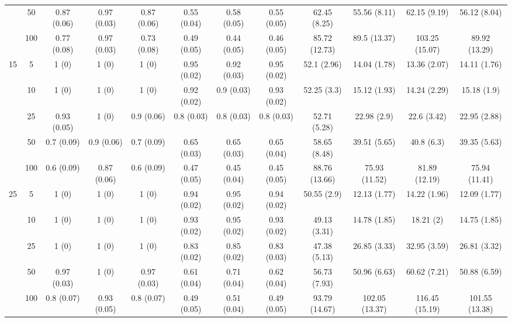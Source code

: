 \documentclass[11pt,3p,review,authoryear]{elsarticle}
\theoremstyle{definition}
\begin{document}
\begin{landscape}
\begin{table}[b]
\begin{center}
{\begin{tabular}{cc|ccc|ccc|cccc|}
  & 50  & 0.87 (0.06) & 0.97 (0.03) & 0.87 (0.06) & 0.55 (0.04) & 0.58 (0.05) & 0.55 (0.05) & 62.45 (8.25) & 55.56 (8.11) & 62.15 (9.19) & 56.12 (8.04) \\ 
  & 100  & 0.77 (0.08) & 0.97 (0.03) & 0.73 (0.08) & 0.49 (0.05) & 0.44 (0.05) & 0.46 (0.05) & 85.72 (12.73) & 89.5 (13.37) & 103.25 (15.07) & 89.92 (13.29) \\[.3cm] 
 \multirow{5}{*}{15} & 5  & 1 (0) & 1 (0) & 1 (0) & 0.95 (0.02) & 0.92 (0.03) & 0.95 (0.02) & 52.1 (2.96) & 14.04 (1.78) & 13.36 (2.07) & 14.11 (1.76) \\ 
  & 10  & 1 (0) & 1 (0) & 1 (0) & 0.92 (0.02) & 0.9 (0.03) & 0.93 (0.02) & 52.25 (3.3) & 15.12 (1.93) & 14.24 (2.29) & 15.18 (1.9) \\ 
    & 25  & 0.93 (0.05) & 1 (0) & 0.9 (0.06) & 0.8 (0.03) & 0.8 (0.03) & 0.8 (0.03) & 52.71 (5.28) & 22.98 (2.9) & 22.6 (3.42) & 22.95 (2.88) \\ 
    & 50  & 0.7 (0.09) & 0.9 (0.06) & 0.7 (0.09) & 0.65 (0.03) & 0.65 (0.03) & 0.65 (0.04) & 58.65 (8.48) & 39.51 (5.65) & 40.8 (6.3) & 39.35 (5.63) \\ 
    & 100  & 0.6 (0.09) & 0.87 (0.06) & 0.6 (0.09) & 0.47 (0.05) & 0.45 (0.04) & 0.45 (0.05) & 88.76 (13.66) & 75.93 (11.52) & 81.89 (12.19) & 75.94 (11.41) \\[.3cm] 
   \multirow{5}{*}{25} & 5  & 1 (0) & 1 (0) & 1 (0) & 0.94 (0.02) & 0.95 (0.02) & 0.94 (0.02) & 50.55 (2.9) & 12.13 (1.77) & 14.22 (1.96) & 12.09 (1.77) \\ 
    & 10  & 1 (0) & 1 (0) & 1 (0) & 0.93 (0.02) & 0.95 (0.02) & 0.93 (0.02) & 49.13 (3.31) & 14.78 (1.85) & 18.21 (2) & 14.75 (1.85) \\ 
    & 25  & 1 (0) & 1 (0) & 1 (0) & 0.83 (0.02) & 0.85 (0.02) & 0.83 (0.03) & 47.38 (5.13) & 26.85 (3.33) & 32.95 (3.59) & 26.81 (3.32) \\ 
    & 50  & 0.97 (0.03) & 1 (0) & 0.97 (0.03) & 0.61 (0.04) & 0.71 (0.04) & 0.62 (0.04) & 56.73 (7.93) & 50.96 (6.63) & 60.62 (7.21) & 50.88 (6.59) \\ 
    & 100  & 0.8 (0.07) & 0.93 (0.05) & 0.8 (0.07) & 0.49 (0.05) & 0.51 (0.04) & 0.49 (0.05) & 93.79 (14.67) & 102.05 (13.37) & 116.45 (15.19) & 101.55 (13.38) \\
\end{tabular}}
   \end{center}
      \vspace{-.5cm}
\end{table}
\end{landscape}
\end{document}
